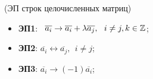 \begin{definition}(ЭП строк целочисленных матриц)
    \begin{itemize}
        \item \textbf{ЭП1}: \ $\overline{a_i} \to \overline{a_i} + \lambda \overline{a_j}, \ \ i \neq j, k \in \mathbb{Z}$;
        \item \textbf{ЭП2}: $\overline{a_i} \leftrightarrow  \overline{a_j}, \ \ i \neq j$;
        \item \textbf{ЭП3}: $\overline{a_i} \rightarrow (-1) \overline{a_i}$;
    \end{itemize}
\end{definition}

